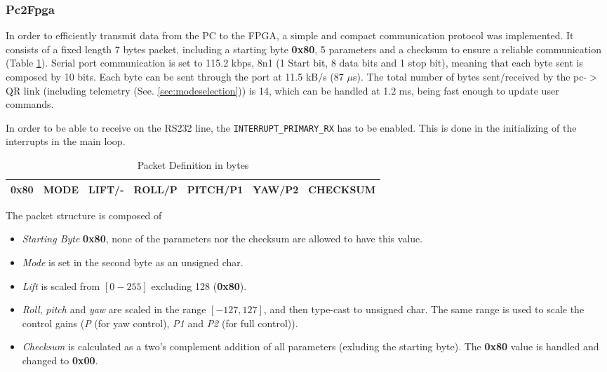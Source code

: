 \documentclass{article}
\begin{document}
\subsubsection{Pc2Fpga}
In order to efficiently transmit  data from the PC to the FPGA, a simple and compact communication protocol was implemented. It consists of a fixed length 7 bytes packet, including a starting byte \textbf{0x80}, 5 parameters and a checksum to ensure a reliable communication (Table \ref{tbl:PkgDefinition}). Serial port communication is set to 115.2 kbps, 8n1 (1 Start bit, 8 data bits and 1 stop bit), meaning that each byte sent is composed by 10 bits. Each byte can be sent through the port at 11.5 kB/s (87 $\mu$s). The total number of bytes sent/received by the pc-$>$ QR link (including telemetry (See. \ref{sec:modeselection})) is 14, which can be handled at 1.2 ms, being fast enough to update user commands.

In order to be able to receive on the RS232 line, the \texttt{INTERRUPT\_PRIMARY\_RX} has to be enabled. This is done in the initializing of the interrupts in the main loop. 

\begin{table}[ht]
\centering
\begin{tabular}{|c|c|c|c|c|c|c|}
\hline 
0x80 & MODE & LIFT/- & ROLL/P & PITCH/P1 & YAW/P2 & CHECKSUM \\ 
\hline 
\end{tabular} 
\caption{Packet Definition in bytes}
\label{tbl:PkgDefinition}
\end{table}

The packet structure is composed of
\begin{itemize}

\item{\emph{Starting Byte} \textbf{0x80}, none of the parameters nor the checksum are allowed to have this value.}

\item{\emph{Mode} is set in the second byte as an unsigned char.}

\item{\emph{Lift} is scaled from $[0-255]$ excluding 128 (\textbf{0x80}).}

\item{\emph{Roll}, \emph{pitch} and \emph{yaw} are scaled in the range $[-127,127]$, and then type-cast to unsigned char. The same range is used to scale the control gains (\emph{P} (for yaw control), \emph{P1} and \emph{P2} (for full control)).}

\item{\emph{Checksum} is calculated as a two's complement addition of all parameters (exluding the starting byte). The \textbf{0x80} value is handled and changed to \textbf{0x00}.}

\end{itemize}
\end{document}
